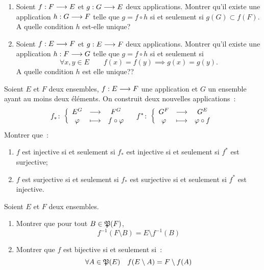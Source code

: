 \begin{exercice}
  \begin{enumerate}
    \item Soient \(f:F \longrightarrow{} E\) et \(g:G \longrightarrow{} E\) deux
      applications. Montrer qu'il existe une application
      \(h:G \longrightarrow{} F\) telle que \(g = f \circ h\) si et seulement
      si \(g(G) \subset{}f(F)\). A quelle condition \(h\) est-elle unique?
    \item Soient \(f:E \longrightarrow{} F\) et \(g:E \longrightarrow{} F\) deux
      applications. Montrer qu'il existe une application
      \(h:F \longrightarrow{} G\) telle que \(g = f \circ h\) si et seulement
      si
      \begin{equation}
        \forall{}x,y \in{}E \qquad f(x) = f(y) \implies g(x) = g(y).
      \end{equation}
      A quelle condition \(h\) est elle unique??
  \end{enumerate}
\end{exercice}

\begin{exercice}
  Soient \(E\) et \(F\) deux ensembles, \(f:E \longrightarrow{} F\) une
  application et \(G\) un ensemble ayant au moins deux éléments. On construit
  deux nouvelles applications~:
  \begin{equation}
    f_{*}\colon\left\{\begin{array}{ccc}E^G & \longrightarrow &F^G\\\varphi & \longmapsto & f \circ \varphi\end{array}\right. \quad
    f^{*}\colon\left\{\begin{array}{ccc}G^F & \longrightarrow &G^E\\\varphi & \longmapsto & \varphi \circ f\end{array}\right.
  \end{equation}
  Montrer que~:
  \begin{enumerate}
    \item \(f\) est injective si et seulement si \(f_{*}\) est injective si
      et seulement si \(f^{*}\) est surjective;
    \item \(f\) est surjective si et seulement si \(f_{*}\) est surjective
      si et seulement si \(f^{*}\) est injective.
  \end{enumerate}
\end{exercice}

\begin{exercice}
  Soient \(E\) et \(F\) deux ensembles.
  \begin{enumerate}
    \item Montrer que pour tout \(B \in{}\mathfrak{P}(F)\),
      \begin{equation}
        f^{-1}(F\setminus B) = E \setminus f^{-1}(B)
      \end{equation}
    \item Montrer que \(f\) est bijective si et seulement si~:
      \begin{equation}
        \forall{}A \in{}\mathfrak{P}(E) \quad f(E\setminus A) = F\setminus f(A)
      \end{equation}
  \end{enumerate}
\end{exercice}

